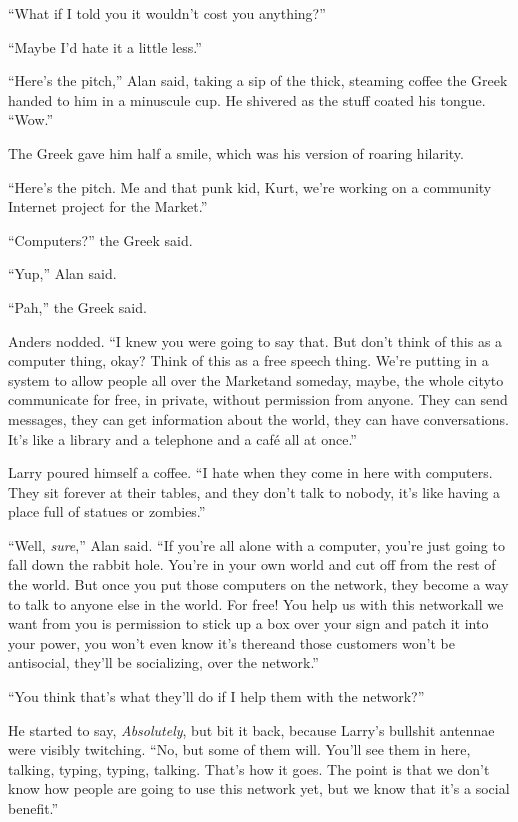 ``What if I told you it wouldn't cost you anything?''

``Maybe I'd hate it a little less.''

``Here's the pitch,'' Alan said, taking a sip of the thick, steaming
coffee the Greek handed to him in a minuscule cup.  He shivered as the
stuff coated his tongue.  ``Wow.''

The Greek gave him half a smile, which was his version of roaring
hilarity.

``Here's the pitch.  Me and that punk kid, Kurt, we're working on a
community Internet project for the Market.''

``Computers?'' the Greek said.

``Yup,'' Alan said.

``Pah,'' the Greek said.

Anders nodded.  ``I knew you were going to say that.  But don't think
of this as a computer thing, okay?  Think of this as a free speech
thing.  We're putting in a system to allow people all over the
Market\dash{}and someday, maybe, the whole city\dash{}to communicate for free,
in private, without permission from anyone.  They can send messages,
they can get information about the world, they can have conversations. 
It's like a library and a telephone and a caf\'{e} all at once.''

Larry poured himself a coffee.  ``I hate when they come in here with
computers.  They sit forever at their tables, and they don't talk to
nobody, it's like having a place full of statues or zombies.''

``Well, \textit{sure},'' Alan said.  ``If you're all alone with a
computer, you're just going to fall down the rabbit hole.  You're in
your own world and cut off from the rest of the world.  But once you
put those computers on the network, they become a way to talk to
anyone else in the world.  For free!  You help us with this
network\dash{}all we want from you is permission to stick up a box over
your sign and patch it into your power, you won't even know it's
there\dash{}and those customers won't be antisocial, they'll be
socializing, over the network.''

``You think that's what they'll do if I help them with the network?''

He started to say, \textit{Absolutely}, but bit it back, because
Larry's bullshit antennae were visibly twitching.  ``No, but some of
them will.  You'll see them in here, talking, typing, typing, talking. 
That's how it goes.  The point is that we don't know how people are
going to use this network yet, but we know that it's a social
benefit.''

